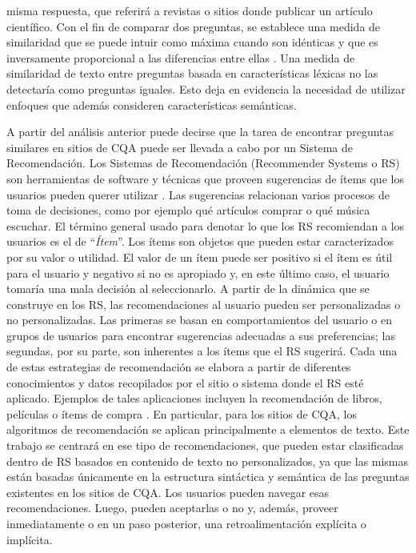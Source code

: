 misma respuesta, que referirá a revistas o sitios donde publicar un artículo científico. Con el fin de comparar dos preguntas, se establece una medida de similaridad que se puede intuir como máxima cuando son idénticas y que es inversamente proporcional a las diferencias entre ellas \citep{lin1998information}. Una medida de similaridad de texto entre preguntas basada en características léxicas no las detectaría como preguntas iguales. Esto deja en evidencia la necesidad de utilizar enfoques que además consideren características semánticas.

\bigskip A partir del análisis anterior puede decirse que la tarea de encontrar preguntas similares en sitios de CQA puede ser llevada a cabo por un Sistema de Recomendación. Los Sistemas de Recomendación (Recommender Systems o RS) son herramientas de software y técnicas que proveen sugerencias de ítems que los usuarios pueden querer utilizar \citep{ricci2011introduction}. Las sugerencias relacionan varios procesos de toma de decisiones, como por ejemplo qué artículos comprar o qué música escuchar. El término general usado para denotar lo que los RS recomiendan a los usuarios es el de “\textit{Ítem}”. Los ítems son objetos que pueden estar caracterizados por su valor o utilidad. El valor de un ítem puede ser positivo si el ítem es útil para el usuario y negativo si no es apropiado y, en este último caso, el usuario tomaría una mala decisión al seleccionarlo. A partir de la dinámica que se construye en los RS, las recomendaciones al usuario pueden ser personalizadas o no personalizadas. Las primeras se basan en comportamientos del usuario o en grupos de usuarios para encontrar sugerencias adecuadas a sus preferencias; las segundas, por su parte, son inherentes a los ítems que el RS sugerirá. Cada una de estas estrategias de recomendación se elabora a partir de diferentes conocimientos y datos recopilados por el sitio o sistema donde el RS esté aplicado. Ejemplos de tales aplicaciones incluyen la recomendación de libros, películas o ítems de compra \citep{adomavicius2005toward}. En particular, para los sitios de CQA, los algoritmos de recomendación se aplican principalmente a elementos de texto. Este trabajo se centrará en ese tipo de recomendaciones, que pueden estar clasificadas dentro de RS basados en contenido de texto no personalizados, ya que las mismas están basadas únicamente en la estructura sintáctica y semántica de las preguntas existentes en los sitios de CQA. Los usuarios pueden navegar esas recomendaciones. Luego, pueden aceptarlas o no y, además, proveer inmediatamente o en un paso posterior, una retroalimentación explícita o implícita.

